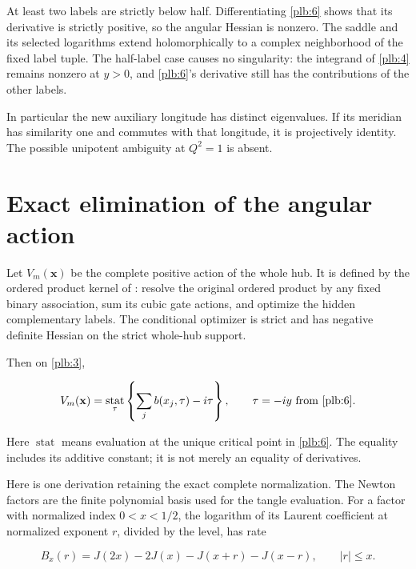 At least two labels are strictly below half. Differentiating \eqref{plb:6} shows that its derivative is strictly positive, so the angular Hessian is nonzero. The saddle and its selected logarithms extend holomorphically to a complex neighborhood of the fixed label tuple. The half-label case causes no singularity: the integrand of \eqref{plb:4} remains nonzero at \(y>0\), and \eqref{plb:6}'s derivative still has the contributions of the other labels.

In particular the new auxiliary longitude has distinct eigenvalues. If its meridian has similarity one and commutes with that longitude, it is projectively identity. The possible unipotent ambiguity at \(Q^2=1\) is absent.

\section{Exact elimination of the angular action}\label{plb:exact-elimination-of-the-angular-action}

Let \(V_m(\mathbf x)\) be the complete positive action of the whole hub.
It is defined by the ordered product kernel of \cite{Newton}: resolve the original ordered product by any fixed binary association, sum its cubic gate actions, and optimize the hidden complementary labels. The conditional optimizer is strict and has negative definite Hessian on the strict whole-hub support.

Then on \eqref{plb:3},

\begin{equation}\label{plb:8}
V_m(\mathbf x)=
 \underset{\tau}{\operatorname{stat}}
       \left\{\sum_jb(x_j,\tau)-i\tau\right\},
 \qquad \tau=-iy \text{ from \eqref{plb:6}}.
\end{equation}

Here $\operatorname{stat}$ means evaluation at the unique critical
point in \eqref{plb:6}. The equality includes its additive constant;
it is not merely an equality of derivatives.

Here is one derivation retaining the exact complete normalization. The Newton factors are the finite polynomial basis used for the
tangle evaluation. For a factor with normalized index \(0<x<1/2\),
the logarithm of its Laurent coefficient at normalized exponent \(r\),
divided by the level, has rate

\begin{equation}\label{plb:9}
B_x(r)=J(2x)-2J(x)-J(x+r)-J(x-r),\qquad |r|\le x.
\end{equation}

